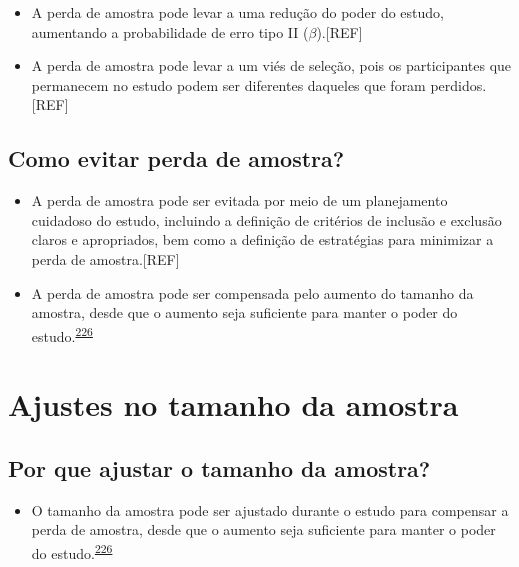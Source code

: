 \documentclass[
  a4paper,
]{book}
\providecommand{\tightlist}{%
  \setlength{\itemsep}{0pt}\setlength{\parskip}{0pt}}
\begin{document}
\begin{itemize}
\item
  A perda de amostra pode levar a uma redução do poder do estudo, aumentando a probabilidade de erro tipo II (\(\beta\)).{[}REF{]}
\item
  A perda de amostra pode levar a um viés de seleção, pois os participantes que permanecem no estudo podem ser diferentes daqueles que foram perdidos.{[}REF{]}
\end{itemize}

\hypertarget{como-evitar-perda-de-amostra}{%
\subsection{Como evitar perda de amostra?}\label{como-evitar-perda-de-amostra}}

\begin{itemize}
\item
  A perda de amostra pode ser evitada por meio de um planejamento cuidadoso do estudo, incluindo a definição de critérios de inclusão e exclusão claros e apropriados, bem como a definição de estratégias para minimizar a perda de amostra.{[}REF{]}
\item
  A perda de amostra pode ser compensada pelo aumento do tamanho da amostra, desde que o aumento seja suficiente para manter o poder do estudo.\textsuperscript{\protect\hyperlink{ref-rodruxedguezdeluxe1guila2014}{226}}
\end{itemize}

\hypertarget{ajustes-no-tamanho-da-amostra}{%
\section{Ajustes no tamanho da amostra}\label{ajustes-no-tamanho-da-amostra}}

\hypertarget{por-que-ajustar-o-tamanho-da-amostra}{%
\subsection{Por que ajustar o tamanho da amostra?}\label{por-que-ajustar-o-tamanho-da-amostra}}

\begin{itemize}
\tightlist
\item
  O tamanho da amostra pode ser ajustado durante o estudo para compensar a perda de amostra, desde que o aumento seja suficiente para manter o poder do estudo.\textsuperscript{\protect\hyperlink{ref-rodruxedguezdeluxe1guila2014}{226}}
\end{itemize}
\end{document}
